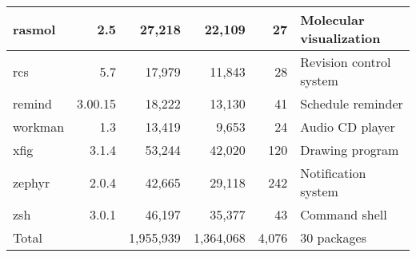 \begin{tabular}{|l|r|r|r|r|l|}
rasmol & 2.5 & 27,218 & 22,109 & 27 & Molecular visualization\\\hline
rcs & 5.7 & 17,979 & 11,843 & 28 & Revision control system \\\hline
remind & 3.00.15 & 18,222 & 13,130 & 41 & Schedule reminder \\\hline
workman & 1.3 & 13,419 & 9,653 & 24 & Audio CD player \\\hline
xfig & 3.1.4 & 53,244 & 42,020 & 120 & Drawing program \\\hline
zephyr & 2.0.4 & 42,665 & 29,118 & 242 & Notification system \\\hline
zsh & 3.0.1 & 46,197 & 35,377 & 43 & Command shell \\\hline
\hline
Total & & 1,955,939 & 1,364,068 & 4,076 & 30 packages\\\hline
\end{tabular}

